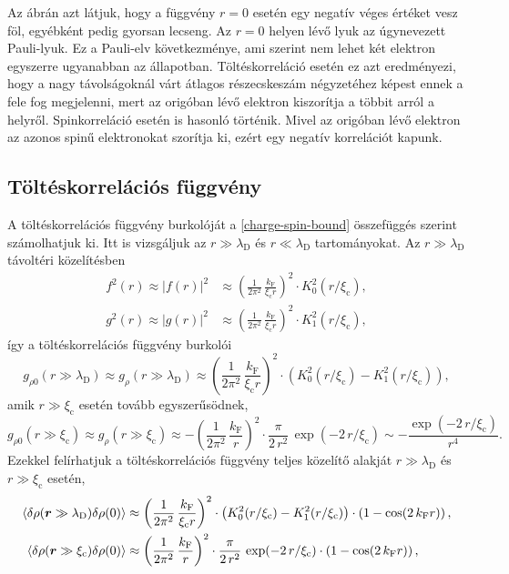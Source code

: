 \documentclass[a4paper,12pt,titlepage]{article}
\newcommand{\RR}{{\vb*{r}}}
\newcommand{\kF}{{k_\text{F}}}
\newcommand{\xic}{{\xi_\text{c}}}
\begin{document}
Az ábrán azt látjuk, hogy a függvény $r = 0$ esetén egy negatív véges értéket vesz föl, egyébként pedig gyorsan lecseng.  Az $r = 0$ helyen lévő lyuk az úgynevezett Pauli-lyuk.  Ez a Pauli-elv következménye, ami szerint nem lehet két elektron egyszerre ugyanabban az állapotban.  Töltéskorreláció esetén ez azt eredményezi, hogy a nagy távolságoknál várt átlagos részecskeszám négyzetéhez képest ennek a fele fog megjelenni, mert az origóban lévő elektron kiszorítja a többit arról a helyről.  Spinkorreláció esetén is hasonló történik.  Mivel az origóban lévő elektron az azonos spinű elektronokat szorítja ki, ezért egy negatív korrelációt kapunk.


\subsection{Töltéskorrelációs függvény}

A töltéskorrelációs függvény burkolóját a \eqref{charge-spin-bound} összefüggés szerint számolhatjuk ki.  Itt is vizsgáljuk az $r \gg \lambda_\text{D}$ és $r \ll \lambda_\text{D}$ tartományokat.  Az $r \gg \lambda_\text{D}$ távoltéri közelítésben
\begin{equation} \label{f2-g2-far}
\begin{split}
	f^2(r) \approx \left| f(r) \right|^2 & \approx \left( \frac{1}{2 \pi^2} \, \frac{\kF}{\xic r} \right)^2 \cdot K_0^2(r / \xic), \\
	g^2(r) \approx \left| g(r) \right|^2 & \approx \left( \frac{1}{2 \pi^2} \, \frac{\kF}{\xic r} \right)^2 \cdot K_1^2(r / \xic),
\end{split}
\end{equation}
így a töltéskorrelációs függvény burkolói
\begin{equation}
	g_{\rho 0}(r \gg \lambda_\text{D}) \approx g_\rho(r \gg \lambda_\text{D}) \approx \left( \frac{1}{2 \pi^2} \, \frac{\kF}{\xic r} \right)^2 \cdot \left( K_0^2(r / \xic) - K_1^2(r / \xic) \right),
\end{equation}
amik $r \gg \xic$ esetén tovább egyszerűsödnek,
\begin{equation}
	g_{\rho 0}(r \gg \xic) \approx g_\rho(r \gg \xic) \approx -\left( \frac{1}{2 \pi^2} \, \frac{\kF}{r} \right)^2 \cdot \frac{\pi}{2 \, r^2} \, \exp(-2 \, r / \xic) \sim -\frac{\exp(-2 \, r / \xic)}{r^4}.
\end{equation}
Ezekkel felírhatjuk a töltéskorrelációs függvény teljes közelítő alakját $r \gg \lambda_\text{D}$ és $r \gg \xic$ esetén,
\begin{equation}
\begin{split}
	\expval{\delta\rho(\RR \gg \lambda_\text{D}) \delta\rho(0)} & \approx \left( \frac{1}{2 \pi^2} \, \frac{\kF}{\xic r} \right)^2 \cdot \left( K_0^2(r / \xic) - K_1^2(r / \xic) \right) \cdot \left( 1 - \cos(2 \, \kF r) \right), \\
	\expval{\delta\rho(\RR \gg \xic) \delta\rho(0)} & \approx \left( \frac{1}{2 \pi^2} \, \frac{\kF}{r} \right)^2 \cdot \frac{\pi}{2 \, r^2} \, \exp(-2 \, r / \xic) \cdot \left( 1 - \cos(2 \, \kF r) \right),
\end{split}
\end{equation}
\end{document}
